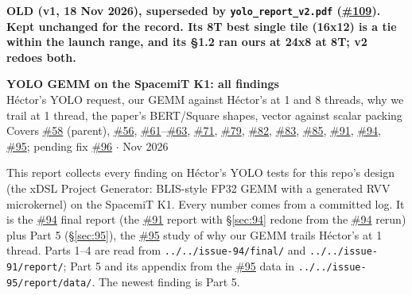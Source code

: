 \documentclass[10pt,a4paper]{article}
\newcommand{\iss}[1]{\href{https://github.com/JieGH/RVV_code_gen_via_MLIR_xDSL/issues/#1}{\##1}}
\begin{document}
\noindent\colorbox{scal!20}{\parbox{\dimexpr\textwidth-2\fboxsep}{\centering\bfseries OLD (v1, 18 Nov 2026), superseded by \texttt{yolo\_report\_v2.pdf} (\iss{109}).\\[1pt]\normalfont\small Kept unchanged for the record. Its 8T best single tile (16x12) is a tie within the launch range, and its \S1.2 ran ours at 24x8 at 8T; v2 redoes both.}}\par\medskip
\begin{center}
{\Large\bfseries YOLO GEMM on the SpacemiT K1: all findings}\\[4pt]
H\'ector's YOLO request, our GEMM against H\'ector's at 1 and 8 threads, why we trail at 1 thread, the paper's BERT/Square shapes, vector against scalar packing\\[2pt]
Covers \iss{58} (parent), \iss{56}, \iss{61}--\iss{63}, \iss{71}, \iss{79}, \iss{82}, \iss{83}, \iss{85}, \iss{91}, \iss{94}, \iss{95}; pending fix \iss{96} \quad$\cdot$ Nov 2026
\end{center}

\noindent This report collects every finding on H\'ector's YOLO tests for this repo's design (the xDSL Project Generator:
BLIS-style FP32 GEMM with a generated RVV microkernel) on the SpacemiT K1. Every number comes from a committed log. It is the \iss{94} final report (the \iss{91} report with \S\ref{sec:94} redone from the \iss{94} rerun) plus Part 5 (\S\ref{sec:95}), the \iss{95} study of why our GEMM trails H\'ector's at 1 thread. Parts 1--4 are read from \texttt{../../issue-94/final/} and \texttt{../../issue-91/report/}; Part 5 and its appendix from the \iss{95} data in \texttt{../../issue-95/report/data/}. The newest finding is Part 5.








\end{document}
